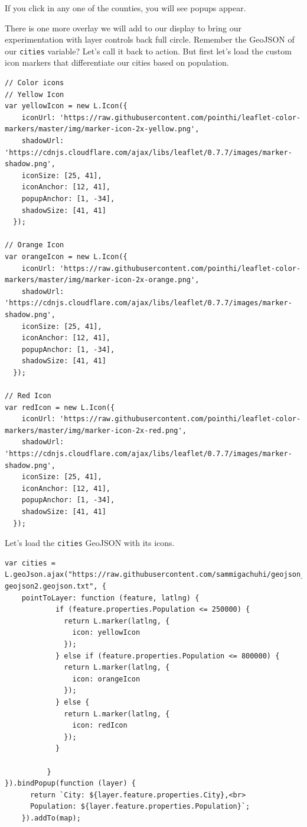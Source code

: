 \documentclass[
]{book}
\begin{document}
If you click in any one of the counties, you will see popups appear.

There is one more overlay we will add to our display to bring our experimentation with layer controls back full circle. Remember the GeoJSON of our \texttt{cities} variable? Let's call it back to action. But first let's load the custom icon markers that differentiate our cities based on population.

\begin{verbatim}
// Color icons
// Yellow Icon
var yellowIcon = new L.Icon({
    iconUrl: 'https://raw.githubusercontent.com/pointhi/leaflet-color-markers/master/img/marker-icon-2x-yellow.png',
    shadowUrl: 'https://cdnjs.cloudflare.com/ajax/libs/leaflet/0.7.7/images/marker-shadow.png',
    iconSize: [25, 41],
    iconAnchor: [12, 41],
    popupAnchor: [1, -34],
    shadowSize: [41, 41]
  });

// Orange Icon
var orangeIcon = new L.Icon({
    iconUrl: 'https://raw.githubusercontent.com/pointhi/leaflet-color-markers/master/img/marker-icon-2x-orange.png',
    shadowUrl: 'https://cdnjs.cloudflare.com/ajax/libs/leaflet/0.7.7/images/marker-shadow.png',
    iconSize: [25, 41],
    iconAnchor: [12, 41],
    popupAnchor: [1, -34],
    shadowSize: [41, 41]
  });

// Red Icon
var redIcon = new L.Icon({
    iconUrl: 'https://raw.githubusercontent.com/pointhi/leaflet-color-markers/master/img/marker-icon-2x-red.png',
    shadowUrl: 'https://cdnjs.cloudflare.com/ajax/libs/leaflet/0.7.7/images/marker-shadow.png',
    iconSize: [25, 41],
    iconAnchor: [12, 41],
    popupAnchor: [1, -34],
    shadowSize: [41, 41]
  });
\end{verbatim}

Let's load the \texttt{cities} GeoJSON with its icons.

\begin{verbatim}
var cities = L.geoJson.ajax("https://raw.githubusercontent.com/sammigachuhi/geojson_files/main/cities-geojson2.geojson.txt", {
    pointToLayer: function (feature, latlng) {
            if (feature.properties.Population <= 250000) {
              return L.marker(latlng, {
                icon: yellowIcon 
              });
            } else if (feature.properties.Population <= 800000) {
              return L.marker(latlng, {
                icon: orangeIcon 
              });
            } else {
              return L.marker(latlng, {
                icon: redIcon 
              });
            }
            
          }
}).bindPopup(function (layer) {
      return `City: ${layer.feature.properties.City},<br>
      Population: ${layer.feature.properties.Population}`;
    }).addTo(map);
    
\end{verbatim}
\end{document}
